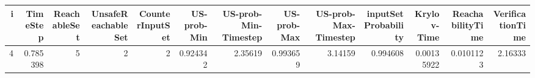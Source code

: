 \begin{tabular}{rrrrrrrrrrrrr}
\hline
   i &   TimeStep &   ReachableSet &   UnsafeReachableSet &   CounterInputSet &   US-prob-Min &   US-prob-Min-Timestep &   US-prob-Max &   US-prob-Max-Timestep &   inputSet Probability &   Krylov-Time &   ReachabilityTime &   VerificationTime \\
\hline
   4 &   0.785398 &              5 &                    2 &                 2 &      0.924342 &                2.35619 &      0.993659 &                3.14159 &               0.994608 &    0.00135922 &          0.0101123 &            2.16333 \\
\hline
\end{tabular}

